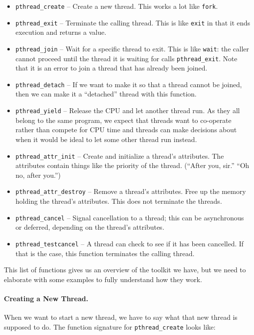 \begin{itemize}
	\item \texttt{pthread\_create} -- Create a new thread. This works a lot like \texttt{fork}.
	\item \texttt{pthread\_exit} -- Terminate the calling thread. This is like \texttt{exit} in that it ends execution and returns a value.
	\item \texttt{pthread\_join} -- Wait for a specific thread to exit. This is like \texttt{wait}: the caller cannot proceed until the thread it is waiting for calls \texttt{pthread\_exit}. Note that it is an error to join a thread that has already been joined.
	\item \texttt{pthread\_detach} -- If we want to make it so that a thread cannot be joined, then we can make it a ``detached'' thread with this function.
	\item \texttt{pthread\_yield} -- Release the CPU and let another thread run. As they all belong to the same program, we expect that threads want to co-operate rather than compete for CPU time and threads can make decisions about when it would be ideal to let some other thread run instead.
	\item \texttt{pthread\_attr\_init} -- Create and initialize a thread's attributes. The attributes contain things like the priority of the thread. (``After you, sir.'' ``Oh no, after you.'')
	\item \texttt{pthread\_attr\_destroy} -- Remove a thread's attributes. Free up the memory holding the thread's attributes. This does not terminate the threads.
	\item \texttt{pthread\_cancel} -- Signal cancellation to a thread; this can be asynchronous or deferred, depending on the thread's attributes.
	\item \texttt{pthread\_testcancel} -- A thread can check to see if it has been cancelled. If that is the case, this function terminates the calling thread.
\end{itemize}

This list of functions gives us an overview of the toolkit we have, but we need to elaborate with some examples to fully understand how they work.

\paragraph{Creating a New Thread.}

When we want to start a new thread, we have to say what that new thread is supposed to do. The function signature for \texttt{pthread\_create} looks like:

